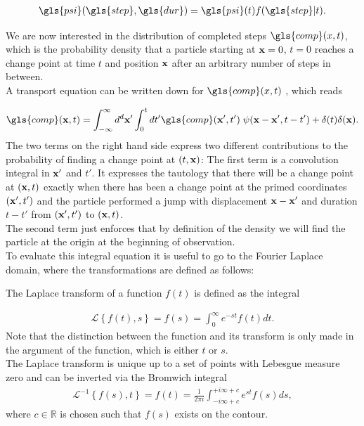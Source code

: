 \begin{align}
\gls{psi}(\gls{step}, \gls{dur}) = \gls{psi}(t) f(\gls{step}|t) .
\end{align}

We are now interested in the distribution of completed steps $\gls{comp}(x,t)$, which is the probability density that a particle starting at $\mathbf{ x }=0$, $t=0$ reaches a change point at time $t$ and position $\mathbf{ x }$ after an arbitrary number of steps in between. \\
A transport equation can be written down for $\gls{comp}(x,t)$ \cite{firstSteps}, which reads

\begin{align}
\gls{comp}(\ve{x},t) = \int_{-\infty}^{\infty} d^{d}\ve{x}' \int_{0}^{t} dt' \gls{comp}(\ve{x}',t')  \; \psi(\ve{x}-\ve{x}',t-t') + \delta(t) \delta(\ve{x}) . \label{eqn:CTransport}
\end{align}
%
The two terms on the right hand side express two different contributions to the probability of finding a change point at $(t,\mathbf{ x })$: The first term is a convolution integral in $\mathbf{ x' }$ and $t'$. It expresses the tautology that there will be a change point at $(\mathbf{ x },t)$ exactly when there has been a change point at the primed coordinates $(\mathbf{ x' },t')$ and the particle performed a jump with displacement $\mathbf{ x }-\mathbf{ x }'$ and duration $t-t'$ from $(\mathbf{ x' },t')$ to $(\mathbf{ x },t)$.  \\
The second term just enforces that by definition of the density we will find the particle at the origin at the beginning of observation. \\
To evaluate this integral equation it is useful to go to the Fourier Laplace domain, where the transformations are defined as follows:

The Laplace transform of a function $f(t)$ is defined as the integral 

\begin{align}
\mathcal{L} \left\{ f(t), s \right\} = f(s) = \int^{\infty}_{0} e^{-st} f(t) dt .
\end{align}
%
Note that the distinction between the function and its transform is only made in the argument of the function, which is either $t$ or $s$. \\
The Laplace transform is unique up to a set of points with Lebesgue measure zero and can be inverted via the Bromwich integral 
%
\begin{align}
\mathcal{L}^{-1} \left\{ f(s), t \right\} = f(t) = \frac{1}{2 \pi i} \int^{+i \infty + c}_{-i \infty + c} e^{st} f(s) ds, 
\end{align}
%
where $c \in \mathbb{R}$ is chosen such that $f(s)$ exists on the contour. 


